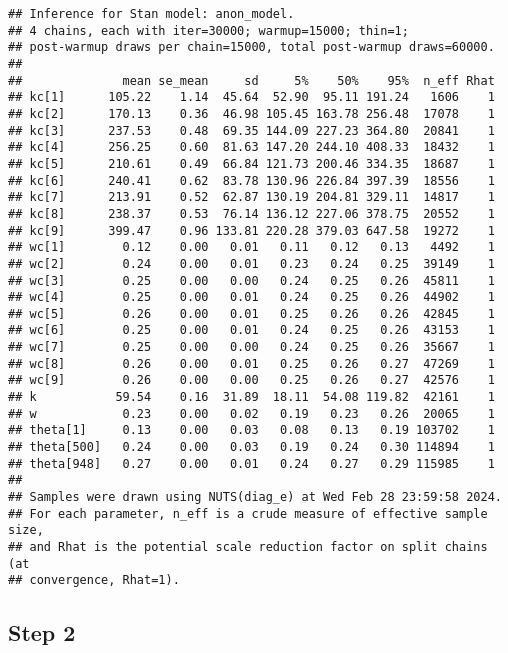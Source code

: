 \documentclass[
]{article}
\newenvironment{Shaded}{\begin{snugshade}}{\end{snugshade}}
\newcommand{\AttributeTok}[1]{\textcolor[rgb]{0.13,0.29,0.53}{#1}}
\newcommand{\CommentTok}[1]{\textcolor[rgb]{0.56,0.35,0.01}{\textit{#1}}}
\newcommand{\DecValTok}[1]{\textcolor[rgb]{0.00,0.00,0.81}{#1}}
\newcommand{\FunctionTok}[1]{\textcolor[rgb]{0.13,0.29,0.53}{\textbf{#1}}}
\newcommand{\NormalTok}[1]{#1}
\newcommand{\OtherTok}[1]{\textcolor[rgb]{0.56,0.35,0.01}{#1}}
\newcommand{\SpecialCharTok}[1]{\textcolor[rgb]{0.81,0.36,0.00}{\textbf{#1}}}
\newcommand{\StringTok}[1]{\textcolor[rgb]{0.31,0.60,0.02}{#1}}
\begin{document}
\begin{verbatim}
## Inference for Stan model: anon_model.
## 4 chains, each with iter=30000; warmup=15000; thin=1; 
## post-warmup draws per chain=15000, total post-warmup draws=60000.
## 
##              mean se_mean     sd     5%    50%    95%  n_eff Rhat
## kc[1]      105.22    1.14  45.64  52.90  95.11 191.24   1606    1
## kc[2]      170.13    0.36  46.98 105.45 163.78 256.48  17078    1
## kc[3]      237.53    0.48  69.35 144.09 227.23 364.80  20841    1
## kc[4]      256.25    0.60  81.63 147.20 244.10 408.33  18432    1
## kc[5]      210.61    0.49  66.84 121.73 200.46 334.35  18687    1
## kc[6]      240.41    0.62  83.78 130.96 226.84 397.39  18556    1
## kc[7]      213.91    0.52  62.87 130.19 204.81 329.11  14817    1
## kc[8]      238.37    0.53  76.14 136.12 227.06 378.75  20552    1
## kc[9]      399.47    0.96 133.81 220.28 379.03 647.58  19272    1
## wc[1]        0.12    0.00   0.01   0.11   0.12   0.13   4492    1
## wc[2]        0.24    0.00   0.01   0.23   0.24   0.25  39149    1
## wc[3]        0.25    0.00   0.00   0.24   0.25   0.26  45811    1
## wc[4]        0.25    0.00   0.01   0.24   0.25   0.26  44902    1
## wc[5]        0.26    0.00   0.01   0.25   0.26   0.26  42845    1
## wc[6]        0.25    0.00   0.01   0.24   0.25   0.26  43153    1
## wc[7]        0.25    0.00   0.00   0.24   0.25   0.26  35667    1
## wc[8]        0.26    0.00   0.01   0.25   0.26   0.27  47269    1
## wc[9]        0.26    0.00   0.00   0.25   0.26   0.27  42576    1
## k           59.54    0.16  31.89  18.11  54.08 119.82  42161    1
## w            0.23    0.00   0.02   0.19   0.23   0.26  20065    1
## theta[1]     0.13    0.00   0.03   0.08   0.13   0.19 103702    1
## theta[500]   0.24    0.00   0.03   0.19   0.24   0.30 114894    1
## theta[948]   0.27    0.00   0.01   0.24   0.27   0.29 115985    1
## 
## Samples were drawn using NUTS(diag_e) at Wed Feb 28 23:59:58 2024.
## For each parameter, n_eff is a crude measure of effective sample size,
## and Rhat is the potential scale reduction factor on split chains (at 
## convergence, Rhat=1).
\end{verbatim}

\hypertarget{step-2}{%
\subsection{Step 2}\label{step-2}}

\begin{Shaded}
\end{Shaded}
\end{document}
